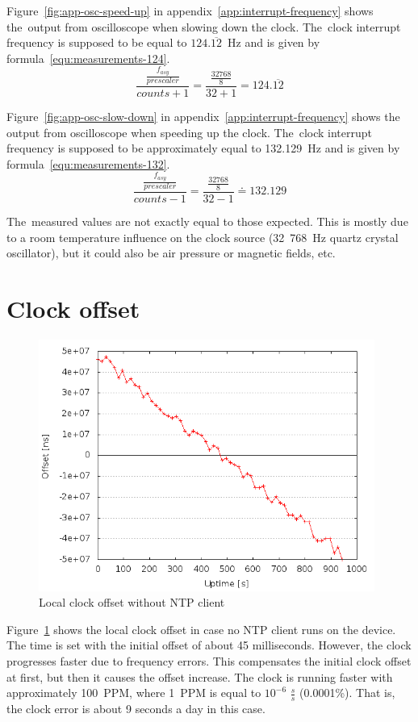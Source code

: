 Figure~\ref{fig:app-osc-speed-up} in appendix~\ref{app:interrupt-frequency} shows the~output from oscilloscope
when slowing down the clock.
The~clock interrupt frequency
is supposed to be equal to $124.\overline{12}$~Hz and is given by formula~\ref{equ:measurements-124}.
\begin{equation}
\label{equ:measurements-124}
\frac{\frac{f_{asy}}{prescaler}}{counts + 1} = \frac{\frac{32768}{8}}{32+1} = 124.\overline{12}
\end{equation}

Figure~\ref{fig:app-osc-slow-down} in appendix~\ref{app:interrupt-frequency} shows the output from oscilloscope
when speeding up the clock.
The~clock interrupt frequency
is supposed to be approximately equal to 132.129~Hz and is given by formula~\ref{equ:measurements-132}.
\begin{equation}
\label{equ:measurements-132}
\frac{\frac{f_{asy}}{prescaler}}{counts - 1} = \frac{\frac{32768}{8}}{32-1} \doteq 132.129
\end{equation}

The~measured values are not exactly equal to those expected.
This is mostly due to a room temperature influence on the clock source
(32~768~Hz quartz crystal oscillator),
but it could also be air pressure or magnetic fields, etc.

\section{Clock offset}
\begin{figure}[H]
  \centering
  \includegraphics[width=11cm,keepaspectratio]{fig/no-ntp.png}
  \caption{Local clock offset without NTP client}
  \label{fig:measurements-no-ntp}
\end{figure}
Figure~\ref{fig:measurements-no-ntp} shows the local clock offset
in case no NTP client runs on the device.
The time is set with the initial offset of about 45 milliseconds.
However, the clock progresses faster due to frequency errors.
This compensates the initial clock offset at first,
but then it causes the offset increase.
The clock is running faster with approximately 100~PPM,
where 1~PPM is equal to $10^{-6}$ $\frac{s}{s}$ (0.0001\%).
That is, the clock error is about 9 seconds a day in this case.

